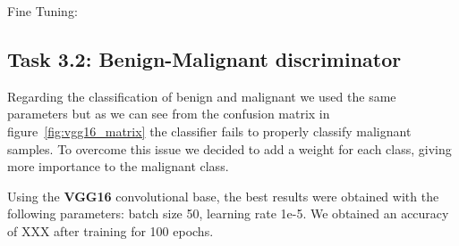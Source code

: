 \documentclass[11pt,a4paper,oneside]{article}
\begin{document}
Fine Tuning:\\


\subsection{Task 3.2: Benign-Malignant discriminator}
Regarding the classification of benign and malignant we used the same parameters but as we can see from the confusion matrix in figure~\ref{fig:vgg16_matrix} the classifier fails to properly classify malignant samples. To overcome this issue we decided to add a weight for each class, giving more importance to the malignant class. 

Using the \textbf{VGG16} convolutional base, the best results were obtained with the following parameters: batch size 50, learning rate 1e-5. We obtained an accuracy of XXX after training for 100 epochs. 
\end{document}
